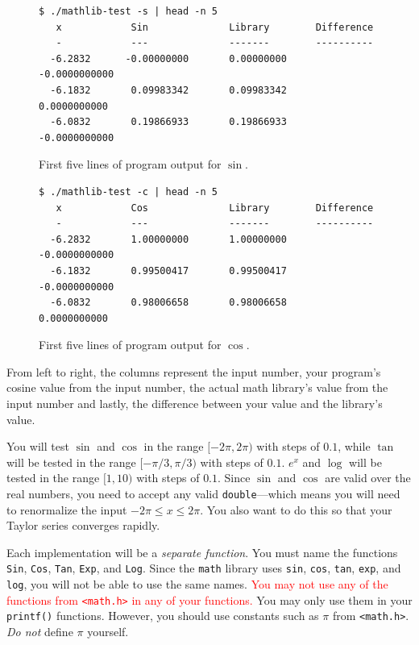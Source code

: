\documentclass[11pt]{article}
\begin{document}
\begin{figure}[h]
\begin{centering}
  \begin{lstlisting}[style=bashstyle]
 $ ./mathlib-test -s | head -n 5
   x            Sin              Library        Difference
   -            ---              -------        ----------
  -6.2832      -0.00000000       0.00000000    -0.0000000000
  -6.1832       0.09983342       0.09983342     0.0000000000
  -6.0832       0.19866933       0.19866933    -0.0000000000\end{lstlisting}
  \caption{First five lines of program output for $\sin$.}\label{sine}
\end{centering}
\end{figure}

\begin{figure}[h]
\begin{centering}
  \begin{lstlisting}[style=bashstyle]
 $ ./mathlib-test -c | head -n 5
   x            Cos              Library        Difference
   -            ---              -------        ----------
  -6.2832       1.00000000       1.00000000    -0.0000000000
  -6.1832       0.99500417       0.99500417    -0.0000000000
  -6.0832       0.98006658       0.98006658     0.0000000000\end{lstlisting}
  \caption{First five lines of program output for $\cos$.}\label{cosine}
\end{centering}
\end{figure}

From left to right, the columns represent the input number, your program's
cosine value from the input number, the actual math library's value from the
input number and lastly, the difference between your value and the library's
value.

You will test $\sin$ and $\cos$ in the range $[-2\pi, 2\pi)$ with steps of $0.1$, while
$\tan$ will be tested in the range $[-\pi/3, \pi/3)$ with steps of $0.1$. $e^x$ and
$\log$ will be tested in the range $[1, 10)$ with steps of $0.1$.
Since $\sin$ and $\cos$ are valid over the real numbers, you need to accept any valid
\texttt{double}---which means you will need to renormalize the input $-2\pi \leq x \leq 2\pi$. You
also want to do this so that your Taylor series converges rapidly.

Each implementation will be a \emph{separate function}. You must name the
functions \texttt{Sin}, \texttt{Cos}, \texttt{Tan}, \texttt{Exp}, and
\texttt{Log}. Since the \texttt{math} library uses \texttt{sin}, \texttt{cos},
\texttt{tan}, \texttt{exp}, and \texttt{log}, you will not be able to use the
same names. \textcolor{red}{You may not use any of the functions from \texttt{<math.h>} in
any of your functions.} You may only use them in your \texttt{printf()} functions.
However, you should
use constants such as $\pi$ from \texttt{<math.h>}. \emph{Do not} define $\pi$ yourself.
\end{document}
